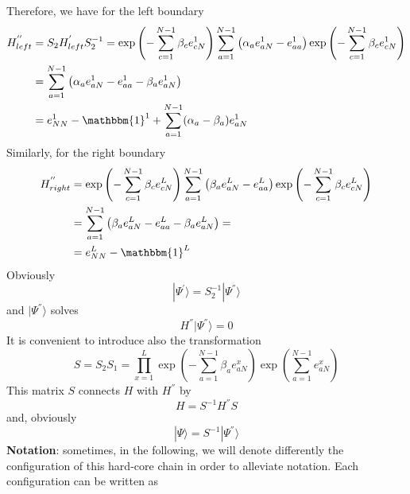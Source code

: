 \documentclass[10pt]{article}
\numberwithin{equation}{section}
\numberwithin{equation}{subsection}
\begin{document}
Therefore, we have for the left boundary
\begin{equation}
	\begin{split}
		H_{left}^{''}&=S_{2}H_{left}^{'}S_{2}^{-1}=\exp{\left(-\sum_{c=1}^{N-1}\beta_{c}e_{cN}^{1}\right)}\sum_{a=1}^{N-1}\left(\alpha_{a}e_{aN}^{1}-e_{aa}^{1}\right)\exp{\left(-\sum_{c=1}^{N-1}\beta_{c}e_{cN}^{1}\right)}
		\\&=
		\sum_{a=1}^{N-1}\left(\alpha_{a}e_{aN}^{1}-e_{aa}^{1}-\beta_{a}e_{aN}^{1}\right)
		\\&=
		e_{NN}^{1}-\mathbbm{1}^{1}+\sum_{a=1}^{N-1}(\alpha_{a}-\beta_{a})e_{aN}^{1}
	\end{split}
\end{equation}
Similarly, for the right boundary
\begin{equation}
	\begin{split}
			H_{right}^{''}&=\exp{\left(-\sum_{c=1}^{N-1}\beta_{c}e_{cN}^{L}\right)}\sum_{a=1}^{N-1}\left(\beta_{a}e_{aN}^{L}-e_{aa}^{L}\right)\exp{\left(-\sum_{c=1}^{N-1}\beta_{c}e_{cN}^{L}\right)}
			\\&=
			\sum_{a=1}^{N-1}\left(\beta_{a}e_{aN}^{L}-e_{aa}^{L}-\beta_{a}e_{aN}^{L}\right)=
			\\&=
			e_{NN}^{L}-\mathbbm{1}^{L}
	\end{split}
\end{equation}
Obviously
\begin{equation}\label{S2-Inverse}
	|\Psi^{'}\rangle = S_{2}^{-1}|\Psi^{''}\rangle
\end{equation}
and $|\Psi^{''}\rangle$ solves
\begin{equation}\label{steadyS-SECOND-def}
	H^{''}|\Psi^{''}\rangle=0
\end{equation}
It is convenient to introduce also the transformation
\begin{equation}\label{similarity}
	S=S_{2}S_{1}=\prod_{x=1}^{L}\exp{\left(-\sum_{a=1}^{N-1}\beta_{a}e_{aN}^{x}\right)}\exp{\left(\sum_{a=1}^{N-1}e_{aN}^{x}\right)}
\end{equation}
This matrix $S$ connects $H$ with $H^{''}$ by 
\begin{equation}
H=S^{-1}H^{''}S
\end{equation}
and, obviously
\begin{equation}
	|\Psi\rangle=S^{-1}|\Psi^{''}\rangle
\end{equation}
\textbf{Notation}: sometimes, in the following, we will denote differently the configuration of this hard-core chain in order to alleviate notation. Each configuration can be written as
\end{document}
